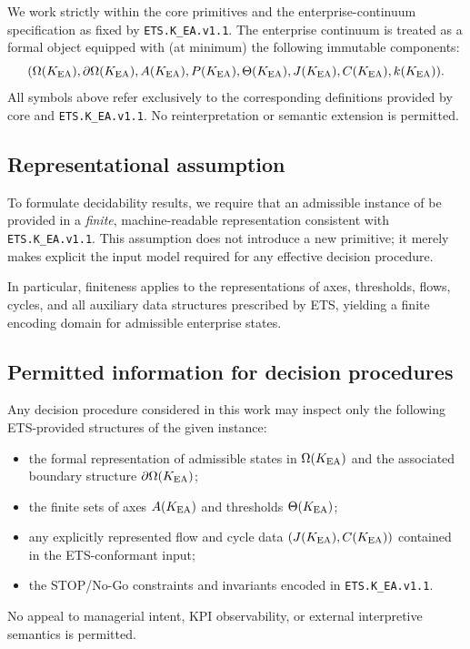 %
%
%

We work strictly within the \OC{} core primitives and the enterprise-continuum
specification \KEA{} as fixed by \texttt{ETS.K\_EA.v1.1}. The enterprise continuum
is treated as a formal object equipped with (at minimum) the following immutable
components:
\[
(\Omega(K_{\mathrm{EA}}), \partial \Omega(K_{\mathrm{EA}}), A(K_{\mathrm{EA}}), P(K_{\mathrm{EA}}), \Theta(K_{\mathrm{EA}}), J(K_{\mathrm{EA}}), C(K_{\mathrm{EA}}), k(K_{\mathrm{EA}})).
\]
All symbols above refer exclusively to the corresponding definitions provided
by \OC{} core and \texttt{ETS.K\_EA.v1.1}. No reinterpretation or semantic
extension is permitted.

\subsection{Representational assumption}
To formulate decidability results, we require that an admissible instance of
\KEA{} be provided in a \emph{finite}, machine-readable representation consistent
with \texttt{ETS.K\_EA.v1.1}. This assumption does not introduce a new primitive;
it merely makes explicit the input model required for any effective decision
procedure.

In particular, finiteness applies to the representations of axes, thresholds,
flows, cycles, and all auxiliary data structures prescribed by ETS, yielding a
finite encoding domain for admissible enterprise states.

\subsection{Permitted information for decision procedures}
Any decision procedure considered in this work may inspect only the following
ETS-provided structures of the given \KEA{} instance:
\begin{itemize}
  \item the formal representation of admissible states in \(\Omega(K_{\mathrm{EA}})\) and the
        associated boundary structure \(\partial \Omega(K_{\mathrm{EA}})\);
  \item the finite sets of axes \(A(K_{\mathrm{EA}})\) and thresholds \(\Theta(K_{\mathrm{EA}})\);
  \item any explicitly represented flow and cycle data
        \((J(K_{\mathrm{EA}}), C(K_{\mathrm{EA}}))\) contained in the ETS-conformant input;
  \item the STOP/No-Go constraints and invariants encoded in
        \texttt{ETS.K\_EA.v1.1}.
\end{itemize}
No appeal to managerial intent, KPI observability, or external interpretive
semantics is permitted.

